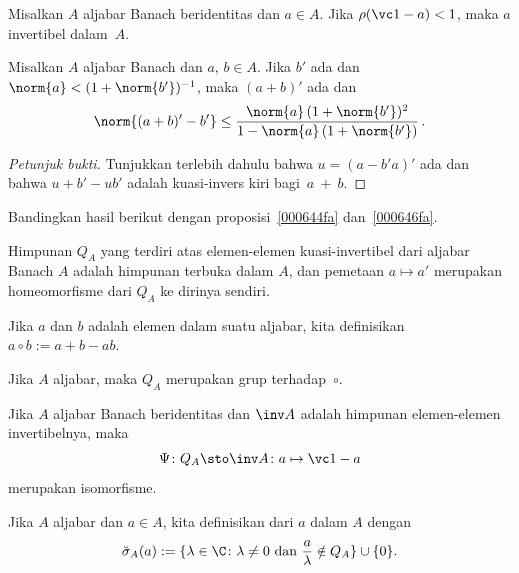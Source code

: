 \begin{prop} Misalkan $A$ aljabar Banach beridentitas dan $a \in A$. Jika $\rho(\vc 1 - a) < 1$, maka
$a$ invertibel dalam~$A$.
\end{prop}

\begin{prop} Misalkan $A$ aljabar Banach dan $a$, $b \in A$. Jika $b'$ ada dan
$\norm{a} < (1 + \norm{b'})^{-1}$, maka $(a + b)'$ ada dan
  \[ \norm{(a + b)' - b'}
           \le \frac{\norm{a}\,(1 + \norm{b'})^2}{1 - \norm{a}\,(1 + \norm{b'})}\,.\]
\end{prop}
 \begin{proof}[\emph{Petunjuk bukti}] Tunjukkan terlebih dahulu bahwa $u = (a - b'a)'$ ada dan bahwa
 $u + b' - ub'$ adalah kuasi-invers kiri bagi~$a~+~b$. \ns
\end{proof}

Bandingkan hasil berikut dengan proposisi~\ref{000644fa} dan~\ref{000646fa}.
\begin{prop} Himpunan $Q_A$ yang terdiri atas
elemen-elemen kuasi-invertibel dari aljabar Banach $A$ adalah himpunan terbuka dalam $A$, dan pemetaan $a \mapsto
a'$ merupakan homeomorfisme dari $Q_A$ ke dirinya sendiri.
\end{prop}

\begin{notn} Jika $a$ dan $b$ adalah elemen dalam suatu aljabar, kita definisikan
$a \circ b := a + b - ab$.
\end{notn}

\begin{prop} Jika $A$ aljabar, maka $Q_A$ merupakan grup terhadap~$\circ$.
\end{prop}

\begin{prop} Jika $A$ aljabar Banach beridentitas dan $\inv A$ adalah himpunan elemen-elemen
invertibelnya, maka
   \[ \Psi\colon Q_A \sto \inv A\colon  a \mapsto \vc 1 - a \]
merupakan isomorfisme.
\end{prop}

\begin{defn} Jika $A$ aljabar dan $a \in A$, kita definisikan
 dari $a$ dalam $A$ dengan
  \[ \breve{\sigma}_A(a) := \{\lambda \in \C\colon  \lambda \ne 0
                      \text{ dan } \dfrac a\lambda \notin Q_A\}\cup\{0\}. \]
\end{defn}

